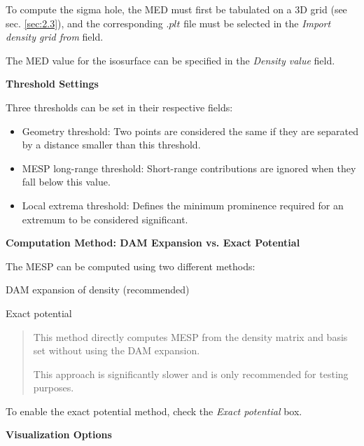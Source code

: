 \documentclass[10pt]{article}
\begin{document}
\vspace*{0.4mm}

To compute the sigma hole, the MED must first be tabulated on a 3D grid (see sec. \ref{sec:2.3}),
and the corresponding $.plt$ file must be selected in the {\it Import density grid from} field.

The MED value for the isosurface can be specified in the {\it Density value} field.


\vspace*{3mm}
{\bf Threshold Settings}
\vspace*{3mm}

Three thresholds can be set in their respective fields:

\begin{itemize}
\item Geometry threshold: Two points are considered the same if they are separated
by a distance smaller than this threshold.
\item MESP long-range threshold: Short-range contributions are ignored
when they fall below this value.
\item Local extrema threshold: Defines the minimum prominence required
for an extremum to be considered significant.
\end{itemize}

\vspace*{3mm}
{\bf Computation Method: DAM Expansion vs. Exact Potential}
\vspace*{3mm}

The MESP can be computed using two different methods:

\begin{enumerate}
\item DAM expansion of density (recommended)
\item Exact potential
\vspace*{-5mm}
\begin{quote}
\item This method directly computes MESP from the density matrix and basis set
without using the DAM expansion.
\item This approach is significantly slower and is only recommended for testing purposes.
\end{quote}
\end{enumerate}

To enable the exact potential method, check the {\it Exact potential} box.

\vspace*{3mm}
{\bf Visualization Options}
\vspace*{3mm}
\end{document}
